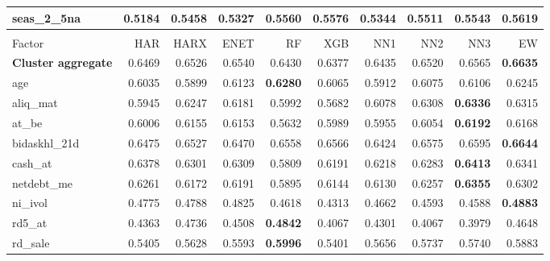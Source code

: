 \begin{longtable}{>{\raggedright\arraybackslash}p{2.6cm}rrrrrrrrr}
seas\_2\_5na & 0.5184 & \cellcolor{blue!10}0.5458 & \cellcolor{blue!10}0.5327 & \cellcolor{blue!10}0.5560 & \cellcolor{blue!10}0.5576 & \cellcolor{blue!10}0.5344 & \cellcolor{blue!10}0.5511 & \cellcolor{blue!10}0.5543 & \textbf{\cellcolor{blue!10}0.5619} \\
\hline
\multicolumn{10}{@{}l}{\textit{Panel D. Low Leverage}} \\
\hline
Factor & HAR & HARX & ENET & RF & XGB & NN1 & NN2 & NN3 & EW \\
\hline
\textbf{Cluster aggregate} & 0.6469 & \cellcolor{blue!10}0.6526 & \cellcolor{blue!10}0.6540 & 0.6430 & 0.6377 & 0.6435 & \cellcolor{blue!10}0.6520 & \cellcolor{blue!10}0.6565 & \textbf{\cellcolor{blue!10}0.6635} \\
age & 0.6035 & 0.5899 & \cellcolor{blue!10}0.6123 & \textbf{\cellcolor{blue!10}0.6280} & \cellcolor{blue!10}0.6065 & 0.5912 & \cellcolor{blue!10}0.6075 & \cellcolor{blue!10}0.6106 & \cellcolor{blue!10}0.6245 \\
aliq\_mat & 0.5945 & \cellcolor{blue!10}0.6247 & \cellcolor{blue!10}0.6181 & \cellcolor{blue!10}0.5992 & 0.5682 & \cellcolor{blue!10}0.6078 & \cellcolor{blue!10}0.6308 & \textbf{\cellcolor{blue!10}0.6336} & \cellcolor{blue!10}0.6315 \\
at\_be & 0.6006 & \cellcolor{blue!10}0.6155 & \cellcolor{blue!10}0.6153 & 0.5632 & 0.5989 & 0.5955 & \cellcolor{blue!10}0.6054 & \textbf{\cellcolor{blue!10}0.6192} & \cellcolor{blue!10}0.6168 \\
bidaskhl\_21d & 0.6475 & \cellcolor{blue!10}0.6527 & 0.6470 & \cellcolor{blue!10}0.6558 & \cellcolor{blue!10}0.6566 & 0.6424 & \cellcolor{blue!10}0.6575 & \cellcolor{blue!10}0.6595 & \textbf{\cellcolor{blue!10}0.6644} \\
cash\_at & 0.6378 & 0.6301 & 0.6309 & 0.5809 & 0.6191 & 0.6218 & 0.6283 & \textbf{\cellcolor{blue!10}0.6413} & 0.6341 \\
netdebt\_me & 0.6261 & 0.6172 & 0.6191 & 0.5895 & 0.6144 & 0.6130 & 0.6257 & \textbf{\cellcolor{blue!10}0.6355} & \cellcolor{blue!10}0.6302 \\
ni\_ivol & 0.4775 & \cellcolor{blue!10}0.4788 & \cellcolor{blue!10}0.4825 & 0.4618 & 0.4313 & 0.4662 & 0.4593 & 0.4588 & \textbf{\cellcolor{blue!10}0.4883} \\
rd5\_at & 0.4363 & \cellcolor{blue!10}0.4736 & \cellcolor{blue!10}0.4508 & \textbf{\cellcolor{blue!10}0.4842} & 0.4067 & 0.4301 & 0.4067 & 0.3979 & \cellcolor{blue!10}0.4648 \\
rd\_sale & 0.5405 & \cellcolor{blue!10}0.5628 & \cellcolor{blue!10}0.5593 & \textbf{\cellcolor{blue!10}0.5996} & 0.5401 & \cellcolor{blue!10}0.5656 & \cellcolor{blue!10}0.5737 & \cellcolor{blue!10}0.5740 & \cellcolor{blue!10}0.5883 \\

\end{longtable}
